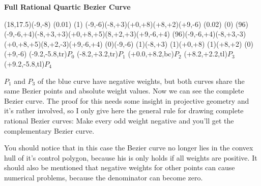 


\begin{center}
{\Huge \bf{Full Rational Quartic Bezier Curve}}
\bigskip

\begin{lapdf}(18,17.5)(-9,-8)
 \Setwidth(0.01)
 \Dash(1)
 \Polygon(-9,-6)(-8,+3)(+0,+8)(+8,+2)(+9,-6) \Stroke
 \Setwidth(0.02)
 \Dash(0)
 \Red
 \Rcurve(96)(-9,-6,+4)(-8,+3,+3)(+0,+8,+5)(8,+2,+3)(+9,-6,+4) \Stroke
 \Blue
 \Rcurve(96)(-9,-6,+4)(-8,+3,-3)(+0,+8,+5)(8,+2,-3)(+9,-6,+4) \Stroke
 \Black
 \Point(0)(-9,-6)
 \Point(1)(-8,+3)
 \Point(1)(+0,+8)
 \Point(1)(+8,+2)
 \Point(0)(+9,-6)
 \Text(-9.2,-5.8,tr){$P_0$}
 \Text(-8.2,+3.2,tr){$P_1$}
 \Text(+0.0,+8.2,bc){$P_2$}
 \Text(+8.2,+2.2,tl){$P_3$}
 \Text(+9.2,-5.8,tl){$P_4$}
\end{lapdf}
\end{center}
\parskip0.2cm
$P_1$ and $P_3$ of the blue curve have negative weights, but both curves
share the same Bezier points and absolute weight values. Now we can see
the complete Bezier curve. The proof for this needs some insight in
projective geometry and it's rather involved, so I only give here the
general rule for drawing complete rational Bezier curves: Make every odd
weight negative and you'll get the complementary Bezier curve.

You should notice that in this case the Bezier curve no longer lies in
the convex hull of it's control polygon, because his is only holds if all
weights are positive. It should also be mentioned that negative weights for
other points can cause numerical problems, because the denominator can
become zero.

